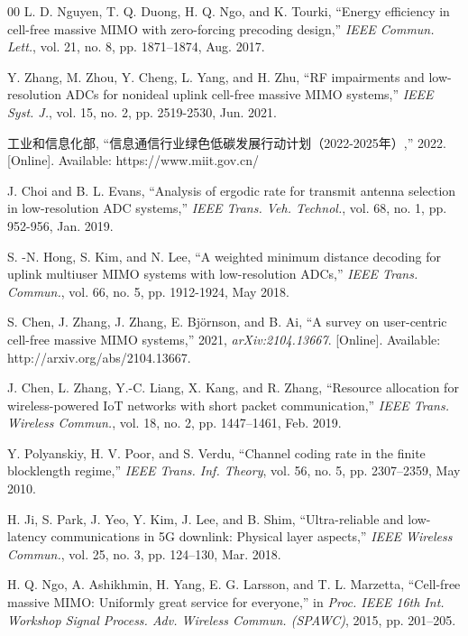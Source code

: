 \begin{thebibliography}{00}
L. D. Nguyen, T. Q. Duong, H. Q. Ngo, and K. Tourki, ``Energy efficiency in cell-free massive MIMO with zero-forcing precoding design,'' \textit{IEEE Commun. Lett.}, vol. 21, no. 8, pp. 1871--1874, Aug. 2017.

Y. Zhang, M. Zhou, Y. Cheng, L. Yang, and H. Zhu, ``RF impairments and low-resolution ADCs for nonideal uplink cell-free massive MIMO systems,'' \textit{IEEE Syst. J.}, vol. 15, no. 2, pp. 2519-2530, Jun. 2021.

工业和信息化部, ``信息通信行业绿色低碳发展行动计划（2022-2025年）,'' 2022. [Online]. Available: https://www.miit.gov.cn/

J. Choi and B. L. Evans, ``Analysis of ergodic rate for transmit antenna selection in low-resolution ADC systems,'' \textit{IEEE Trans. Veh. Technol.}, vol. 68, no. 1, pp. 952-956, Jan. 2019.

S. -N. Hong, S. Kim, and N. Lee, ``A weighted minimum distance decoding for uplink multiuser MIMO systems with low-resolution ADCs,'' \textit{IEEE Trans. Commun.}, vol. 66, no. 5, pp. 1912-1924, May 2018.

S. Chen, J. Zhang, J. Zhang, E. Bj{\"o}rnson, and B. Ai, ``A survey on user-centric cell-free massive MIMO systems,'' 2021, \textit{arXiv:2104.13667}. [Online]. Available: http://arxiv.org/abs/2104.13667.

J. Chen, L. Zhang, Y.-C. Liang, X. Kang, and R. Zhang, ``Resource allocation for wireless-powered IoT networks with short packet communication,'' \textit{IEEE Trans. Wireless Commun.}, vol. 18, no. 2, pp. 1447--1461, Feb. 2019.

Y. Polyanskiy, H. V. Poor, and S. Verdu, ``Channel coding rate in the finite blocklength regime,'' \textit{IEEE Trans. Inf. Theory}, vol. 56, no. 5, pp. 2307--2359, May 2010.

H. Ji, S. Park, J. Yeo, Y. Kim, J. Lee, and B. Shim, ``Ultra-reliable and low-latency communications in 5G downlink: Physical layer aspects,'' \textit{IEEE Wireless Commun.}, vol. 25, no. 3, pp. 124--130, Mar. 2018.

H. Q. Ngo, A. Ashikhmin, H. Yang, E. G. Larsson, and T. L. Marzetta, ``Cell-free massive MIMO: Uniformly great service for everyone,'' in \textit{Proc. IEEE 16th Int. Workshop Signal Process. Adv. Wireless Commun. (SPAWC)}, 2015, pp. 201--205.


\end{thebibliography}
